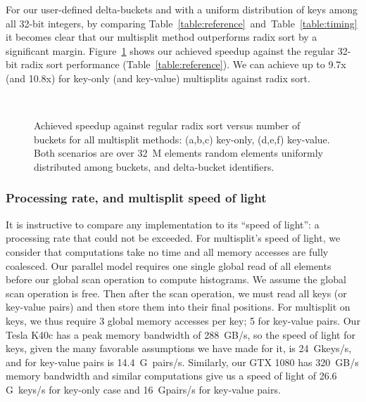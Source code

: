 For our user-defined delta-buckets and with a uniform distribution of keys among all 32-bit integers, by comparing Table~\ref{table:reference}~and~Table~\ref{table:timing} it becomes clear that our multisplit method outperforms radix sort by a significant margin. Figure~\ref{fig:speedup} shows our achieved speedup against the regular 32-bit radix sort performance (Table~\ref{table:reference}).
We can achieve up to 9.7x (and 10.8x) for key-only (and key-value) multisplits against radix sort.

\begin{figure}
\centering
{}
\\
\caption{Achieved speedup against regular radix sort versus number of buckets for all multisplit methods: (a,b,c) key-only, (d,e,f) key-value. Both scenarios are over 32~M elements random elements uniformly distributed among buckets, and delta-bucket identifiers.} \label{fig:speedup}
\end{figure}

\subsubsection{Processing rate, and multisplit speed of light}\label{sec:perf_rate}
It is instructive to compare any implementation to its ``speed of light'': a processing rate that could not be exceeded.
For multisplit's speed of light, we consider that computations take no time and all memory accesses are fully coalesced. Our parallel model requires one single global read of all elements before our global scan operation to compute histograms. We assume the global scan operation is free. Then after the scan operation, we must read all keys (or key-value pairs) and then store them into their final positions. For multisplit on keys, we thus require 3 global memory accesses per key; 5 for key-value pairs.
Our Tesla K40c has a peak memory bandwidth of 288~GB/s, so the speed of light for keys, given the many favorable assumptions we have made for it, is 24~Gkeys/s, and for key-value pairs is 14.4~G~pairs/s.
Similarly, our GTX 1080 has 320~GB/s memory bandwidth and similar computations give us a speed of light of 26.6 G~keys/s for key-only case and 16~Gpairs/s for key-value pairs.

